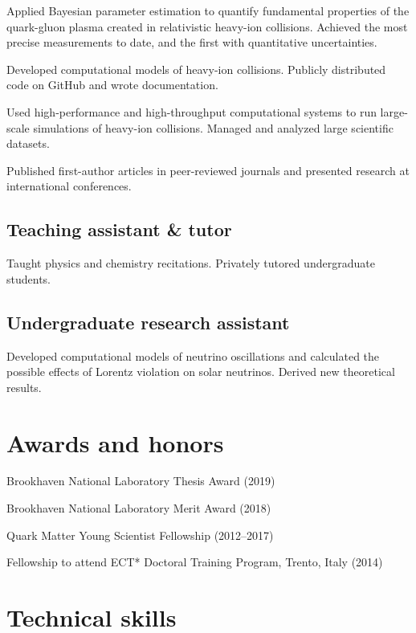 \documentclass[letterpaper,10pt]{article}
\begin{document}
\begin{multicols}{2}
Applied Bayesian parameter estimation to quantify fundamental properties of the quark-gluon plasma created in relativistic heavy-ion collisions.
Achieved the most precise measurements to date, and the first with quantitative uncertainties.

Developed computational models of heavy-ion collisions.
Publicly distributed code on GitHub and wrote documentation.

Used high-performance and high-throughput computational systems to run large-scale simulations of heavy-ion collisions.
Managed and analyzed large scientific datasets.

Published first-author articles in peer-reviewed journals and presented research at international conferences.

\subsection{Teaching assistant \& tutor}

Taught physics and chemistry recitations.
Privately tutored undergraduate students.

\subsection{Undergraduate research assistant}

Developed computational models of neutrino oscillations and calculated the possible effects of Lorentz violation on solar neutrinos.
Derived new theoretical results.


\section{Awards and honors}

Brookhaven National Laboratory Thesis Award (2019)

Brookhaven National Laboratory Merit Award (2018)

Quark Matter Young Scientist Fellowship (2012--2017)

Fellowship to attend ECT* Doctoral Training Program, Trento, Italy (2014)



\columnbreak


\section{Technical skills}


\end{multicols}
\end{document}
